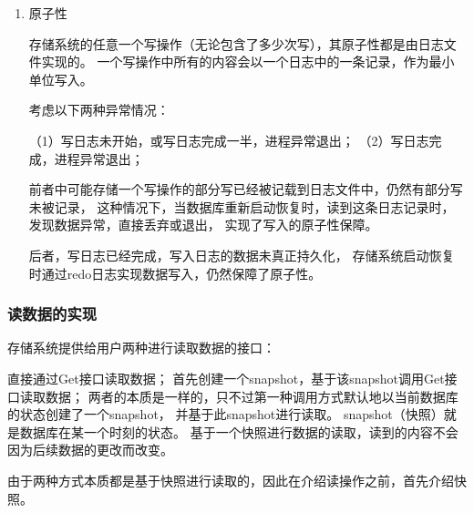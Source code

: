 \begin{enumerate}
		\item 原子性
		
		存储系统的任意一个写操作（无论包含了多少次写），其原子性都是由日志文件实现的。
		一个写操作中所有的内容会以一个日志中的一条记录，作为最小单位写入。

		考虑以下两种异常情况：

		（1）写日志未开始，或写日志完成一半，进程异常退出；
		（2）写日志完成，进程异常退出；

		前者中可能存储一个写操作的部分写已经被记载到日志文件中，仍然有部分写未被记录，
		这种情况下，当数据库重新启动恢复时，读到这条日志记录时，发现数据异常，直接丢弃或退出，
		实现了写入的原子性保障。

		后者，写日志已经完成，写入日志的数据未真正持久化，
		存储系统启动恢复时通过redo日志实现数据写入，仍然保障了原子性。

		\end{enumerate}


		\subsubsection{读数据的实现}

	存储系统提供给用户两种进行读取数据的接口：

	直接通过Get接口读取数据；
	首先创建一个snapshot，基于该snapshot调用Get接口读取数据；
	两者的本质是一样的，只不过第一种调用方式默认地以当前数据库的状态创建了一个snapshot，
	并基于此snapshot进行读取。
	snapshot（快照）就是数据库在某一个时刻的状态。
	基于一个快照进行数据的读取，读到的内容不会因为后续数据的更改而改变。
	
	由于两种方式本质都是基于快照进行读取的，因此在介绍读操作之前，首先介绍快照。

